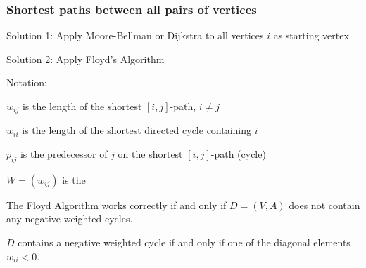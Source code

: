 \begin{lec}[2011-10-24]\end{lec}

\subsubsection*{Shortest paths between all pairs of vertices}

Solution 1: Apply Moore-Bellman or Dijkstra to all vertices $i$ as starting vertex

Solution 2: Apply Floyd's Algorithm

Notation: 

$w_{ij}$ is the length of the shortest $[i,j]$-path, $i \neq j$

$w_{ii}$ is the length of the shortest directed cycle containing $i$

$p_{ij}$ is the predecessor of $j$ on the shortest $[i,j]$-path (cycle)

$W =(w_{ij}) $ is the 



\begin{thm} %
The Floyd Algorithm works correctly if and only if $D = (V,A)$ does not contain any negative weighted cycles.

$D$ contains a negative weighted cycle if and only if one of the diagonal elements $w_{ii}<0$.
\end{thm}

